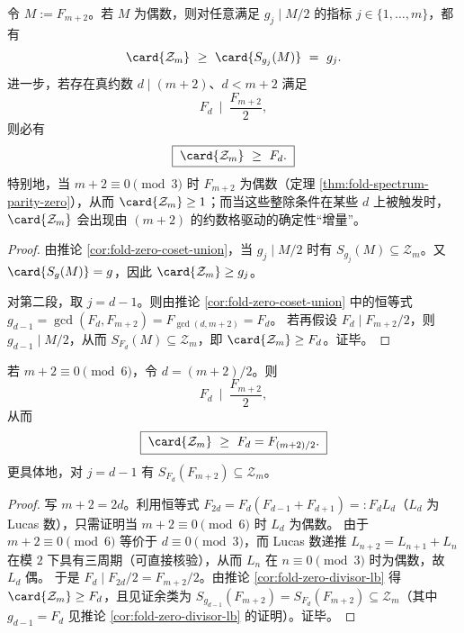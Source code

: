 \begin{corollary}\label{cor:fold-zero-divisor-lb}
令 \(M:=F_{m+2}\)。若 \(M\) 为偶数，则对任意满足 \(g_j\mid M/2\) 的指标 \(j\in\{1,\dots,m\}\)，都有
\[
\card{\mathcal{Z}_m}\ \ge\ \card{S_{g_j}(M)}\ =\ g_j.
\]
进一步，若存在真约数 \(d\mid(m+2)\)、\(d<m+2\) 满足
\[
F_d\ \mid\ \frac{F_{m+2}}{2},
\]
则必有
\[
\boxed{\;\card{\mathcal{Z}_m}\ \ge\ F_d.\;}
\]
特别地，当 \(m+2\equiv 0\pmod 3\) 时 \(F_{m+2}\) 为偶数（定理 \ref{thm:fold-spectrum-parity-zero}），从而 \(\card{\mathcal{Z}_m}\ge 1\)；而当这些整除条件在某些 \(d\) 上被触发时，\(\card{\mathcal{Z}_m}\) 会出现由 \((m+2)\) 的约数格驱动的确定性“增量”。
\end{corollary}
\begin{proof}
由推论 \ref{cor:fold-zero-coset-union}，当 \(g_j\mid M/2\) 时有 \(S_{g_j}(M)\subseteq \mathcal{Z}_m\)。又 \(\card{S_g(M)}=g\)，因此 \(\card{\mathcal{Z}_m}\ge g_j\)。
\par
对第二段，取 \(j=d-1\)。则由推论 \ref{cor:fold-zero-coset-union} 中的恒等式
\(
g_{d-1}=\gcd(F_d,F_{m+2})=F_{\gcd(d,m+2)}=F_d
\)。
若再假设 \(F_d\mid F_{m+2}/2\)，则 \(g_{d-1}\mid M/2\)，从而 \(S_{F_d}(M)\subseteq \mathcal{Z}_m\)，即 \(\card{\mathcal{Z}_m}\ge F_d\)。证毕。
\end{proof}

\begin{corollary}[六倍窗的半阶大陪集零点块]\label{cor:fold-zero-half-index-multiple6}
若 \(m+2\equiv 0\pmod 6\)，令 \(d=(m+2)/2\)。则
\[
F_d\ \mid\ \frac{F_{m+2}}{2},
\]
从而
\[
\boxed{\;\card{\mathcal{Z}_m}\ \ge\ F_d=F_{(m+2)/2}.\;}
\]
更具体地，对 \(j=d-1\) 有 \(S_{F_d}(F_{m+2})\subseteq \mathcal{Z}_m\)。
\end{corollary}
\begin{proof}
写 \(m+2=2d\)。利用恒等式 \(F_{2d}=F_d(F_{d-1}+F_{d+1})=:F_dL_d\)（\(L_d\) 为 Lucas 数），只需证明当 \(m+2\equiv 0\pmod 6\) 时 \(L_d\) 为偶数。
由于 \(m+2\equiv 0\pmod 6\) 等价于 \(d\equiv 0\pmod 3\)，而 Lucas 数递推 \(L_{n+2}=L_{n+1}+L_n\) 在模 \(2\) 下具有三周期（可直接核验），从而 \(L_n\) 在 \(n\equiv 0\pmod 3\) 时为偶数，故 \(L_d\) 偶。
于是 \(F_d\mid F_{2d}/2=F_{m+2}/2\)。由推论 \ref{cor:fold-zero-divisor-lb} 得 \(\card{\mathcal{Z}_m}\ge F_d\)，且见证余类为 \(S_{g_{d-1}}(F_{m+2})=S_{F_d}(F_{m+2})\subseteq \mathcal{Z}_m\)（其中 \(g_{d-1}=F_d\) 见推论 \ref{cor:fold-zero-divisor-lb} 的证明）。证毕。
\end{proof}

